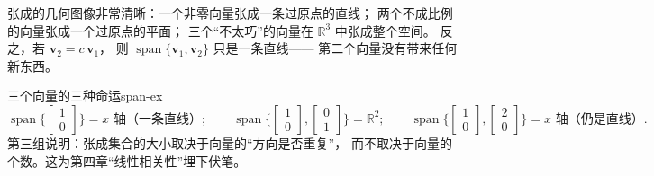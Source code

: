 \documentclass[11pt,a4paper,openany]{ctexbook}
\DeclareMathOperator{\Span}{span}
\newcommand{\Rnum}[1]{\mathbb{R}^{#1}}
\begin{document}
\begin{keypoint}
张成的几何图像非常清晰：一个非零向量张成一条过原点的直线；
两个不成比例的向量张成一个过原点的平面；
三个“不太巧”的向量在 $\Rnum{3}$ 中张成整个空间。
反之，若 $\boldsymbol{v}_2=c\,\boldsymbol{v}_1$，
则 $\Span\{\boldsymbol{v}_1,\boldsymbol{v}_2\}$ 只是一条直线——
第二个向量没有带来任何新东西。
\end{keypoint}

\begin{exmp}{三个向量的三种命运}{span-ex}
\[
\Span\Big\{\begin{bmatrix}1\\0\end{bmatrix}\Big\}
=\text{$x$ 轴（一条直线）};\qquad
\Span\Big\{\begin{bmatrix}1\\0\end{bmatrix},
              \begin{bmatrix}0\\1\end{bmatrix}\Big\}=\Rnum{2};\qquad
\Span\Big\{\begin{bmatrix}1\\0\end{bmatrix},
              \begin{bmatrix}2\\0\end{bmatrix}\Big\}
=\text{$x$ 轴（仍是直线）}.
\]
第三组说明：张成集合的大小取决于向量的“方向是否重复”，
而不取决于向量的个数。这为第四章“线性相关性”埋下伏笔。
\end{exmp}
\end{document}
